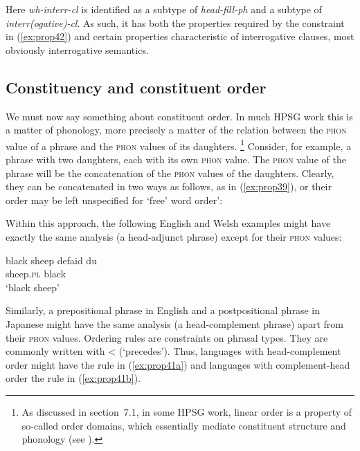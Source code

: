 \documentclass[output=paper
	        ,collection
	        ,collectionchapter
 	        ,biblatex
                ,babelshorthands
                ,newtxmath
                ,draftmode
                ,colorlinks, citecolor=brown
]{langscibook}
\begin{document}
Here \emph{wh-interr-cl} is identified as a subtype of \emph{head-fill-ph} and a subtype of \emph{interr(ogative)-cl}. As such, it has both the properties required by the constraint in (\ref{ex:prop42}) and certain properties characteristic of interrogative clauses, most obviously interrogative semantics.

\subsection{Constituency and constituent order}

We must now say something about constituent order. In much HPSG work this is a matter of phonology, more precisely a matter of the relation between the \textsc{phon} value of a phrase and the \textsc{phon} values of its daughters.%
%
\footnote{As discussed in section~7.1, in some HPSG work, linear order is a property of so-called order domains, which essentially mediate constituent structure and phonology (see ). }
%
Consider, for example, a phrase with two daughters, each with its own \textsc{phon} value. The \textsc{phon} value of the phrase will be the concatenation of the \textsc{phon} values of the daughters. Clearly, they can be concatenated in two ways as follows, as in (\ref{ex:prop39}), or their order may be left unspecified for ‘free’ word order’:

\ea\label{ex:prop39}
\z

Within this approach, the following English and Welsh examples might have exactly the same analysis (a head-adjunct phrase) except for their \textsc{phon} values:

\ea\label{ex:prop40}
	\ea\label{ex:prop40a}
	black sheep
	\ex\label{ex:prop40b}
	\gll defaid du\\
	sheep.\textsc{pl} black\\
	\glt ‘black sheep’
	\z
\z

Similarly, a prepositional phrase in English and a postpositional phrase in Japanese might have the same analysis (a head-complement phrase) apart from their \textsc{phon} values. Ordering rules are constraints on phrasal types. They are commonly written with < (‘precedes’). Thus, languages with head-complement order might have the rule in (\ref{ex:prop41a}) and languages with complement-head order the rule in (\ref{ex:prop41b}).
\end{document}
